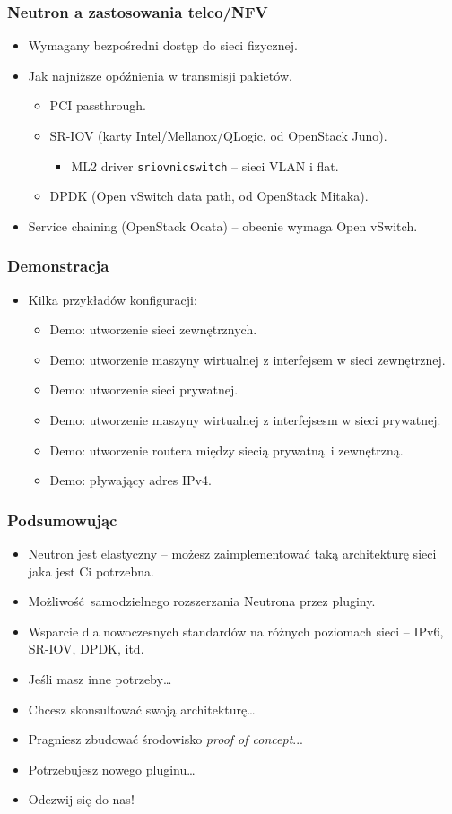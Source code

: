 \documentclass[dvipsnames,table]{beamer}
\begin{document}
\begin{frame}
\frametitle{Neutron a zastosowania telco/NFV}
\begin{itemize}
	\item Wymagany bezpośredni dostęp do sieci fizycznej.
	\item Jak najniższe opóźnienia w transmisji pakietów.
	\begin{itemize}
		\item PCI passthrough.
		\item SR-IOV (karty Intel/Mellanox/QLogic, od OpenStack Juno).
		\begin{itemize}
			\item ML2 driver {\tt sriovnicswitch} -- sieci VLAN i flat.
		\end{itemize}
		\item DPDK (Open vSwitch data path, od OpenStack Mitaka).
	\end{itemize}
	\item Service chaining (OpenStack Ocata) -- obecnie wymaga Open vSwitch.
\end{itemize}
\end{frame}

\begin{frame}
\frametitle{Demonstracja}
\begin{itemize}
	\item Kilka przykładów konfiguracji:
	\begin{itemize}
		\item Demo: utworzenie sieci zewnętrznych.
		\item Demo: utworzenie maszyny wirtualnej z interfejsem w sieci zewnętrznej.
		\item Demo: utworzenie sieci prywatnej.
		\item Demo: utworzenie maszyny wirtualnej z interfejsesm w sieci prywatnej.
		\item Demo: utworzenie routera między siecią prywatną i zewnętrzną.
		\item Demo: pływający adres IPv4.
	\end{itemize}
\end{itemize}
\end{frame}

\begin{frame}
	\frametitle{Podsumowując}
\begin{itemize}
	\item Neutron jest elastyczny -- możesz zaimplementować taką architekturę sieci jaka jest Ci potrzebna.
	\item Możliwość samodzielnego rozszerzania Neutrona przez pluginy.
	\item Wsparcie dla nowoczesnych standardów na różnych poziomach sieci -- IPv6, SR-IOV, DPDK, itd.
	\item Jeśli masz inne potrzeby\dots
	\item Chcesz skonsultować swoją architekturę\dots
	\item Pragniesz zbudować środowisko {\em proof of concept}...
	\item Potrzebujesz nowego pluginu\dots
	\item Odezwij się do nas! 
\end{itemize}
\end{frame}
\end{document}
